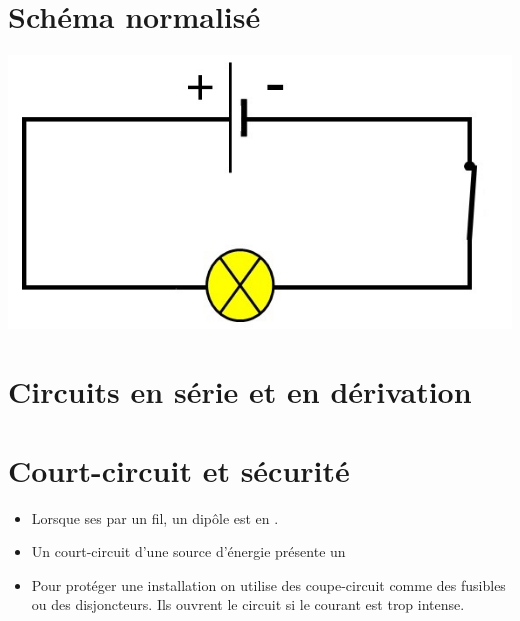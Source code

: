 \documentclass[xcolor={dvipsnames}]{beamer}
\begin{document}
\section{Schéma normalisé}
\begin{frame}
	
	
	\begin{center}
		\includegraphics[scale=0.5]{../img/schema}
	\end{center}
\end{frame}


\section{Circuits en série et en dérivation}

\begin{frame}
	
\end{frame}
\section{Court-circuit et sécurité}


\begin{frame}


\begin{mybilan}
	\begin{itemize}
		\item Lorsque ses  par un fil, un dipôle est en .
		\item Un court-circuit d'une source d'énergie présente un 
		
		\item Pour protéger une installation on utilise des coupe-circuit comme des fusibles ou des disjoncteurs. Ils ouvrent le circuit si le courant est trop intense.
	\end{itemize}
\end{mybilan}

\end{frame}
\end{document}
